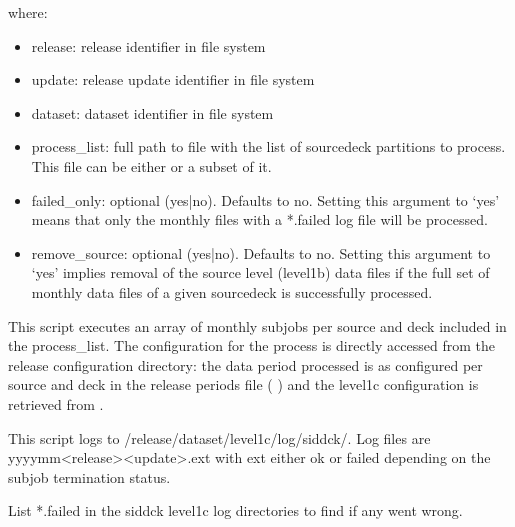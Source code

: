 \documentclass[letterpaper,10pt,english]{sphinxmanual}
\begin{document}
where:
\begin{itemize}
\item {}
release: release identifier in file system

\item {}
update: release update identifier in file system

\item {}
dataset: dataset identifier in file system

\item {}
process\_list: full path to file with the list of source\sphinxhyphen{}deck partitions to
process. This file can be either {\hyperref[\detokenize{index:process-list-file}]{}} or a subset of it.

\item {}
failed\_only: optional (yes|no). Defaults to no. Setting this argument to ‘yes’
means that only the monthly files with a *.failed log file will be processed.

\item {}
remove\_source: optional (yes|no). Defaults to no. Setting this argument to ‘yes’
implies removal of the source level (level1b) data files if the full set of
monthly data files of a given source\sphinxhyphen{}deck is successfully processed.

\end{itemize}

This script executes an array of monthly subjobs per source and deck included in
the process\_list. The configuration for the process is directly accessed from
the release configuration directory: the data period processed is as configured
per source and deck in the release periods file ( {\hyperref[\detokenize{index:release-periods-file}]{}})
and the level1c configuration is retrieved from {\hyperref[\detokenize{index:level1c-config-file}]{}}.

This script logs to /release/dataset/level1c/log/sid\sphinxhyphen{}dck/. Log files
are yyyy\sphinxhyphen{}mm\sphinxhyphen{}\textless{}release\textgreater{}\sphinxhyphen{}\textless{}update\textgreater{}.ext with ext either ok or failed depending on the
subjob termination status.

List  *.failed in the sid\sphinxhyphen{}dck level1c log directories to find if any went wrong.
\end{document}
